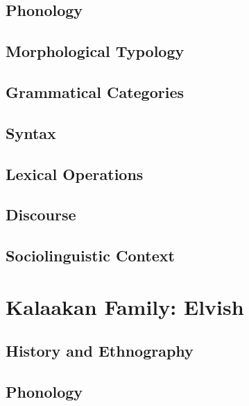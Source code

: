 \documentclass[12pt,letterpaper,openany,twoside]{memoir}
\let\originalpart=\part
\def\part{\cleardoublepage\originalpart}
\begin{document}
\chapter{Phonology}

\chapter{Morphological Typology}

\chapter{Grammatical Categories}

\chapter{Syntax}

\chapter{Lexical Operations}

\chapter{Discourse}

\chapter{Sociolinguistic Context}

\part{Kalaakan Family: Elvish}

\chapter{History and Ethnography}

\chapter{Phonology}
\end{document}
